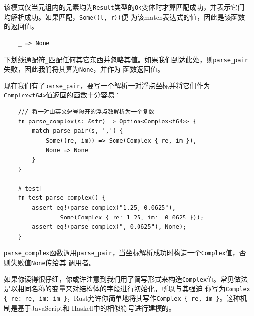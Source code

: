 \smallskip
该模式仅当元组内的元素均为\texttt{Result}类型的\texttt{Ok}变体时才算匹配成功，并表示它们均解析成功。如果匹配，\texttt{Some((l, r))}便
为该match表达式的值，因此是该函数的返回值。
\begin{verbatim}
    _ => None
\end{verbatim}

\smallskip
下划线通配符\texttt{\_}匹配任何其它东西并忽略其值。如果我们到达此处，则\texttt{parse\_pair}失败，因此我们将其算为\texttt{None}，并作为
函数返回值。

\medskip
现在我们有了\texttt{parse\_pair}，要写一个解析一对浮点坐标并将它们作为\texttt{Complex<f64>}值返回的函数十分容易：
\begin{verbatim}
    /// 将一对由英文逗号隔开的浮点数解析为一个复数
    fn parse_complex(s: &str) -> Option<Complex<f64>> {
        match parse_pair(s, ',') {
            Some((re, im)) => Some(Complex { re, im }),
            None => None
        }
    }

    #[test]
    fn test_parse_complex() {
        assert_eq!(parse_complex("1.25,-0.0625"),
                Some(Complex { re: 1.25, im: -0.0625 }));
        assert_eq!(parse_complex(",-0.0625"), None);
    }
\end{verbatim}

\smallskip
\texttt{parse\_complex}函数调用\texttt{parse\_pair}，当坐标解析成功时构造一个\texttt{Complex}值，否则失败值\texttt{None}传给其
调用者。

\medskip
如果你读得很仔细，你或许注意到我们用了简写形式来构造\texttt{Complex}值。常见做法是以相同名称的变量来对结构体的字段进行初始化，所以与其强迫
你写为\texttt{Complex \{ re: re, im: im \}}，Rust允许你简单地将其写作\texttt{Complex \{ re, im \}}。这种机制是基于JavaScript和
Haskell中的相似符号进行建模的。

\medskip
